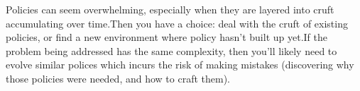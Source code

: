 Policies can seem overwhelming, especially when they are layered into cruft accumulating over time.Then you have a choice: deal with the cruft of existing policies, or find a new environment where policy hasn't built up yet.If the problem being addressed has the same complexity, then you'll likely need to evolve similar polices which incurs the risk of making mistakes (discovering why those policies were needed, and how to craft them).
